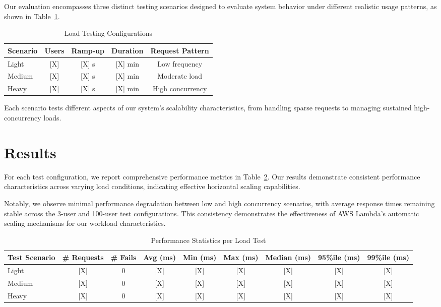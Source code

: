\documentclass[conference]{IEEEtran}
\begin{document}
Our evaluation encompasses three distinct testing scenarios designed to evaluate system behavior under different realistic usage patterns, as shown in Table~\ref{tab:test_configs}.

\begin{table}[h]
\centering
\caption{Load Testing Configurations}
\label{tab:test_configs}
\begin{tabular}{lcccc}
\toprule
Scenario & Users & Ramp-up & Duration & Request Pattern \\
\midrule
Light & [X] & [X] s & [X] min & Low frequency \\
Medium & [X] & [X] s & [X] min & Moderate load \\
Heavy & [X] & [X] s & [X] min & High concurrency \\
\bottomrule
\end{tabular}
\end{table}

Each scenario tests different aspects of our system's scalability characteristics, from handling sparse requests to managing sustained high-concurrency loads.

\section{Results}

For each test configuration, we report comprehensive performance metrics in Table~\ref{tab:performance_stats}. Our results demonstrate consistent performance characteristics across varying load conditions, indicating effective horizontal scaling capabilities.

Notably, we observe minimal performance degradation between low and high concurrency scenarios, with average response times remaining stable across the 3-user and 100-user test configurations. This consistency demonstrates the effectiveness of AWS Lambda's automatic scaling mechanisms for our workload characteristics.

\begin{table}[h]
\centering
\caption{Performance Statistics per Load Test}
\label{tab:performance_stats}
\begin{tabular}{lcccccccc}
\toprule
Test Scenario & \# Requests & \# Fails & Avg (ms) & Min (ms) & Max (ms) & Median (ms) & 95\%ile (ms) & 99\%ile (ms) \\
\midrule
Light & [X] & 0 & [X] & [X] & [X] & [X] & [X] & [X] \\
Medium & [X] & 0 & [X] & [X] & [X] & [X] & [X] & [X] \\
Heavy & [X] & 0 & [X] & [X] & [X] & [X] & [X] & [X] \\
\bottomrule
\end{tabular}
\end{table}
\end{document}
